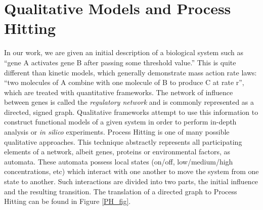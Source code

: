 \documentclass[en]{jdoc}
\begin{document}
  \section{Qualitative Models and Process Hitting}
  
  In our work, we are given an initial description of a biological system such as ``gene A activates gene B after passing some threshold value.'' This is quite different than kinetic models, which generally demonstrate mass action rate laws: ``two molecules of A combine with one molecule of B to produce C at rate r'', which are treated with quantitative frameworks. The network of influence between genes is called the \textit{regulatory network} and is commonly represented as a directed, signed graph. Qualitative frameworks attempt to use this information to construct functional models of a given system in order to perform in-depth analysis or \textit{in silico} experiments. Process Hitting is one of many possible qualitative approaches. This technique abstractly represents all participating elements of a network, albeit genes, proteins or environmental factors, as automata. These automata possess local states (on/off, low/medium/high concentrations, etc) which interact with one another to move the system from one state to another. Such interactions are divided into two parts, the initial influence and the resulting transition. The translation of a directed graph to Process Hitting can be found in Figure \ref{PH_fig}.
\end{document}

